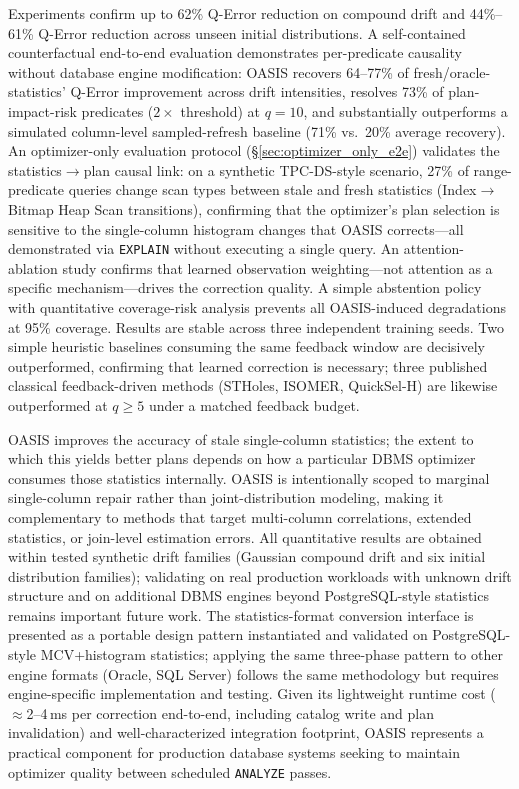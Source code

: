 \documentclass[runningheads]{llncs}
\begin{document}
Experiments confirm up to 62\% Q-Error reduction on compound drift and
44\%--61\% Q-Error reduction across unseen initial distributions.
A self-contained counterfactual end-to-end evaluation demonstrates
per-predicate causality without database engine modification:
OASIS recovers 64--77\% of fresh/oracle-statistics' Q-Error improvement across drift
intensities, resolves 73\% of plan-impact-risk predicates ($2\times$
threshold) at $q{=}10$, and substantially outperforms a simulated
column-level sampled-refresh baseline (71\% vs.\ 20\% average recovery).
An optimizer-only evaluation protocol (\S\ref{sec:optimizer_only_e2e}) validates
the statistics$\rightarrow$plan causal link: on a synthetic TPC-DS-style scenario,
27\% of range-predicate queries change scan types between stale and fresh statistics
(Index$\rightarrow$Bitmap Heap Scan transitions), confirming that the optimizer's
plan selection is sensitive to the single-column histogram changes that OASIS
corrects---all demonstrated via \texttt{EXPLAIN} without executing a single query.
An attention-ablation study confirms that learned observation weighting---not
attention as a specific mechanism---drives the correction quality.
A simple abstention policy with quantitative coverage-risk analysis prevents
all OASIS-induced degradations at 95\% coverage.
Results are stable across three independent training seeds.
Two simple heuristic baselines consuming the same feedback window are decisively
outperformed, confirming that learned correction is necessary;
three published classical feedback-driven methods (STHoles, ISOMER, QuickSel-H)
are likewise outperformed at $q{\geq}5$ under a matched feedback budget.

OASIS improves the accuracy of stale single-column statistics; the extent to which
this yields better plans depends on how a particular DBMS optimizer consumes those
statistics internally.
OASIS is intentionally scoped to marginal single-column repair rather than
joint-distribution modeling, making it complementary to methods that target
multi-column correlations, extended statistics, or join-level estimation
errors.
All quantitative results are obtained within tested synthetic drift families
(Gaussian compound drift and six initial distribution families); validating
on real production workloads with unknown drift structure and on additional
DBMS engines beyond PostgreSQL-style statistics remains important future work.
The statistics-format conversion interface is presented as a portable design
pattern instantiated and validated on PostgreSQL-style MCV+histogram statistics;
applying the same three-phase pattern to other engine formats (Oracle, SQL Server)
follows the same methodology but requires engine-specific implementation and testing.
Given its lightweight runtime cost ($\approx$2--4\,ms per correction end-to-end,
including catalog write and plan invalidation) and well-characterized integration footprint,
OASIS represents a practical component for production database systems
seeking to maintain optimizer quality between scheduled
\texttt{ANALYZE} passes.



\end{document}
